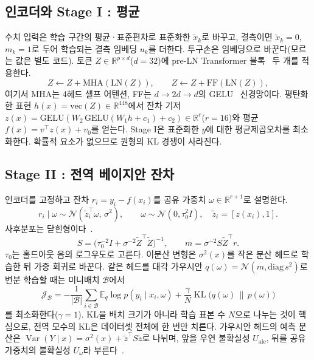 \documentclass[journal,a4paper,10pt]{IEEEtran}
\newcommand{\KL}{\operatorname{KL}}
\newcommand{\E}{\mathbb{E}}
\newcommand{\Var}{\operatorname{Var}}
\newcommand{\N}{\mathcal{N}}
\begin{document}
\subsection{인코더와 Stage I : 평균}
수치 입력은 학습 구간의 평균·표준편차로 표준화한 $\tilde x_k$로 바꾸고, 결측이면 $\tilde x_k=0$, $m_k=1$로 두어 학습되는 결측 임베딩 $u_k$를 더한다. 투구손은 임베딩으로 바꾼다(모르는 값은 별도 코드). 토큰 $Z\in\mathbb{R}^{p\times d}$($d=32$)에 pre-LN Transformer 블록~\cite{vaswani2017attention,xiong2020layer} 두 개를 적용한다.
\begin{equation}
Z\leftarrow Z+\mathrm{MHA}(\mathrm{LN}(Z)),\qquad Z\leftarrow Z+\mathrm{FF}(\mathrm{LN}(Z)),
\label{eq:block}
\end{equation}
여기서 MHA는 4헤드 셀프 어텐션, FF는 $d\to2d\to d$의 GELU~\cite{hendrycks2016gelu} 신경망이다. 평탄화한 표현 $h(x)=\mathrm{vec}(Z)\in\mathbb{R}^{448}$에서 잔차 기저 $z(x)=\mathrm{GELU}(W_2\,\mathrm{GELU}(W_1h+c_1)+c_2)\in\mathbb{R}^{r}$($r=16$)와 평균 $f(x)=v^\top z(x)+v_0$를 얻는다. Stage I은 표준화한 $y$에 대한 평균제곱오차를 최소화한다. 확률적 요소가 없으므로 원형의 KL 경쟁이 사라진다.

\subsection{Stage II : 전역 베이지안 잔차}
인코더를 고정하고 잔차 $r_i=y_i-f(x_i)$를 공유 가중치 $\omega\in\mathbb{R}^{r+1}$로 설명한다.
\begin{equation}
r_i\mid\omega\sim\N(\tilde z_i^\top\omega,\,\sigma^2),\qquad \omega\sim\N(0,\tau_0^2I),\quad \tilde z_i=[z(x_i),1].
\label{eq:blr}
\end{equation}
사후분포는 닫힌형이다~\cite{bishop2006pattern}.
\begin{equation}
S=\big(\tau_0^{-2}I+\sigma^{-2}\tilde Z^\top\tilde Z\big)^{-1},\qquad m=\sigma^{-2}S\tilde Z^\top r.
\label{eq:blrpost}
\end{equation}
$\tau_0$는 홀드아웃 음의 로그우도로 고른다. 이분산 변형은 $\sigma^2(x)$를 작은 분산 헤드로 학습한 뒤 가중 회귀로 바꾼다. 같은 헤드를 대각 가우시안 $q(\omega)=\N(m,\mathrm{diag}\,s^2)$로 변분 학습할 때는 미니배치 $\mathcal{B}$에서
\begin{equation}
\mathcal{J}_{\mathcal{B}}=-\frac{1}{|\mathcal{B}|}\sum_{i\in\mathcal{B}}\E_{q}\log p(y_i\mid x_i,\omega)+\frac{\gamma}{N}\KL\big(q(\omega)\,\|\,p(\omega)\big)
\label{eq:vi}
\end{equation}
를 최소화한다($\gamma=1$). KL을 배치 크기가 아니라 학습 표본 수 $N$으로 나누는 것이 핵심으로, 전역 모수의 KL은 데이터셋 전체에 한 번만 치른다. 가우시안 헤드의 예측 분산은 $\Var(Y\mid x)=\sigma^2(x)+\tilde z^\top S\tilde z$로 나뉘며, 앞을 우연 불확실성 $U_{\mathrm{ale}}$, 뒤를 공유 가중치의 불확실성 $U_\omega$라 부른다~\cite{kendall2017uncertainties}.
\end{document}
